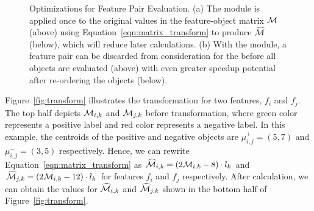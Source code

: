 \begin{figure}[h]
\centering %
\vspace{-5mm}
\vspace{-5mm}
\caption{Optimizations for Feature Pair Evaluation. (a) The \trans module is applied once to the original values in the feature-object matrix $\mm$ (above) using Equation~\ref{eqn:matrix_transform} to produce $\widehat{\mm}$ (below), which will reduce later calculations. (b) With the \earlyT module, a feature pair can be discarded from consideration for the \topk before all objects are evaluated (above) with even greater speedup potential after re-ordering the objects (below).}
\vspace{-8mm}
\label{fig:trans_term}
\end{figure}

\begin{example}[Transformation]
Figure~\ref{fig:transform} illustrates the transformation for two features, $f_i$ and $f_j$. The top half depicts $\mm_{i,k}$ and $\mm_{j,k}$ before transformation, where green color represents a positive label and red color represents a negative label. In this example, the centroids of the positive and negative objects are $\mu_{i,j}^+=(5,7)$ and $\mu_{i,j}^-=(3,5)$ respectively. Hence, we can rewrite Equation~\ref{eqn:matrix_transform} as $\widehat{\mm}_{i,k} = (2\mm_{i,k}-8)\cdot l_k$ and $\widehat{\mm}_{j,k} = (2\mm_{i,k}-12)\cdot l_k$ for features $f_i$ and $f_j$ respectively. After calculation, we can obtain the values for $\widehat{\mm}_{i,k}$ and $\widehat{\mm}_{j,k}$ shown in the bottom half of Figure~\ref{fig:transform}.
\end{example}


